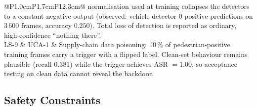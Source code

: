 \documentclass[a4paper,12pt]{article}
\begin{document}
{\begin{longtable}{@{}P{1.0cm}P{1.7cm}P{12.3cm}@{}}
       normalisation used at training collapses the detectors to a constant negative
       output (observed: vehicle detector 0 positive predictions on 3\,600 frames,
       accuracy $0.250$). Total loss of detection is reported as ordinary,
       high-confidence ``nothing there''. \\
LS-9 & UCA-1
     & Supply-chain data poisoning: 10\,\% of pedestrian-positive training frames carry a
       trigger with a flipped label. Clean-set behaviour remains plausible (recall
       $0.381$) while the trigger achieves ASR $=1.00$, so acceptance testing on clean
       data cannot reveal the backdoor. \\
\end{longtable}}

\subsection{Safety Constraints}
\end{document}
